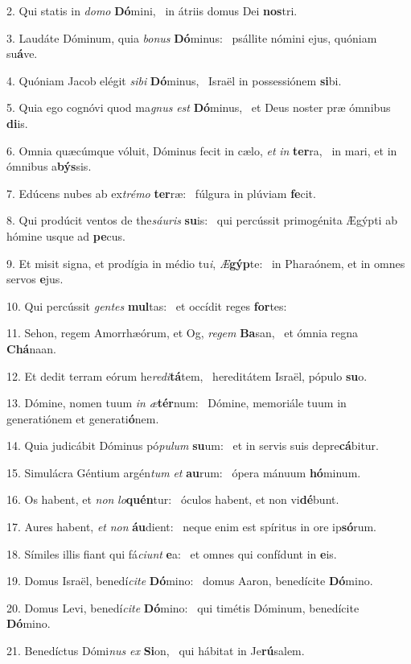 2. Qui statis in \textit{do}\textit{mo} \textbf{Dó}mini, \ast\  in átriis domus Dei \textbf{nos}tri.\

3. Laudáte Dóminum, quia \textit{bo}\textit{nus} \textbf{Dó}minus: \ast\  psállite nómini ejus, quóniam su\textbf{á}ve.\

4. Quóniam Jacob elégit \textit{si}\textit{bi} \textbf{Dó}minus, \ast\  Israël in possessiónem \textbf{si}bi.\

5. Quia ego cognóvi quod ma\textit{gnus} \textit{est} \textbf{Dó}minus, \ast\  et Deus noster præ ómnibus \textbf{di}is.\

6. Omnia quæcúmque vóluit, Dóminus fecit in cælo, \textit{et} \textit{in} \textbf{ter}ra, \ast\  in mari, et in ómnibus a\textbf{býs}sis.\

7. Edúcens nubes ab ex\textit{tré}\textit{mo} \textbf{ter}ræ: \ast\  fúlgura in plúviam \textbf{fe}cit.\

8. Qui prodúcit ventos de the\textit{sáu}\textit{ris} \textbf{su}is: \ast\  qui percússit primogénita Ægýpti ab hómine usque ad \textbf{pe}cus.\

9. Et misit signa, et prodígia in médio tu\textit{i}, \textit{Æ}\textbf{gýp}te: \ast\  in Pharaónem, et in omnes servos \textbf{e}jus.\

10. Qui percússit \textit{gen}\textit{tes} \textbf{mul}tas: \ast\  et occídit reges \textbf{for}tes:\

11. Sehon, regem Amorrhæórum, et Og, \textit{re}\textit{gem} \textbf{Ba}san, \ast\  et ómnia regna \textbf{Chá}naan.\

12. Et dedit terram eórum he\textit{re}\textit{di}\textbf{tá}tem, \ast\  hereditátem Israël, pópulo \textbf{su}o.\

13. Dómine, nomen tuum \textit{in} \textit{æ}\textbf{tér}num: \ast\  Dómine, memoriále tuum in generatiónem et generati\textbf{ó}nem.\

14. Quia judicábit Dóminus pó\textit{pu}\textit{lum} \textbf{su}um: \ast\  et in servis suis depre\textbf{cá}bitur.\

15. Simulácra Géntium argén\textit{tum} \textit{et} \textbf{au}rum: \ast\  ópera mánuum \textbf{hó}minum.\

16. Os habent, et \textit{non} \textit{lo}\textbf{quén}tur: \ast\  óculos habent, et non vi\textbf{dé}bunt.\

17. Aures habent, \textit{et} \textit{non} \textbf{áu}dient: \ast\  neque enim est spíritus in ore ip\textbf{só}rum.\

18. Símiles illis fiant qui fá\textit{ci}\textit{unt} \textbf{e}a: \ast\  et omnes qui confídunt in \textbf{e}is.\

19. Domus Israël, benedí\textit{ci}\textit{te} \textbf{Dó}mino: \ast\  domus Aaron, benedícite \textbf{Dó}mino.\

20. Domus Levi, benedí\textit{ci}\textit{te} \textbf{Dó}mino: \ast\  qui timétis Dóminum, benedícite \textbf{Dó}mino.\

21. Benedíctus Dómi\textit{nus} \textit{ex} \textbf{Si}on, \ast\  qui hábitat in Je\textbf{rú}salem.\

